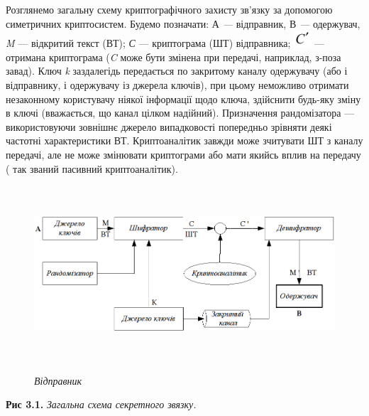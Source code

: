 Розглянемо загальну схему криптографічного захисту зв’язку за допомогою
симетричних криптосистем.  Будемо позначати: А \textit{--- }відправник, В
\textit{--- }одержувач, \textit{M}\textit{ }--- відкритий текст (ВТ);
\textit{С}\textit{ }--- криптограма (ШТ) відправника; 
\includegraphics[width=0.252in,height=0.2398in]{crypt-img/crypt-img3.png} 
---отримана криптограма (\textit{C}\textit{ }може бути змінена при передачі,
наприклад, з-поза завад). Ключ \textit{k }заздалегідь передається по закритому
каналу одержувачу (або і відправнику, і одержувачу із джерела ключів), при
цьому неможливо отримати незаконному користувачу ніякої інформації щодо ключа,
здійснити будь-яку зміну в ключі  (вважається, що канал цілком надійний).
Призначення рандомізатора --- використовуючи  зовнішнє джерело випадковості
попередньо зрівняти деякі частотні характеристики ВТ.  Криптоаналітик завжди
може зчитувати ШТ з каналу передачі, але не може змінювати криптограми або мати
якийсь вплив на передачу ( так званий пасивний криптоаналітик).


\bigskip

{\centering \par}

\begin{figure}
\centering
\begin{minipage}{6.7165in}
{\centering 
\includegraphics[width=6.5909in,height=2.5602in]{crypt-img/crypt-img4.png}
\par}
\begin{minipage}{1.1161in}
{\itshape
Відправник}
\end{minipage}\end{minipage}
\end{figure}
{\centering
\textbf{Рис 3.1.} \textit{Загальна схема секретного зв{\textquotesingle}язку.}
\par}



